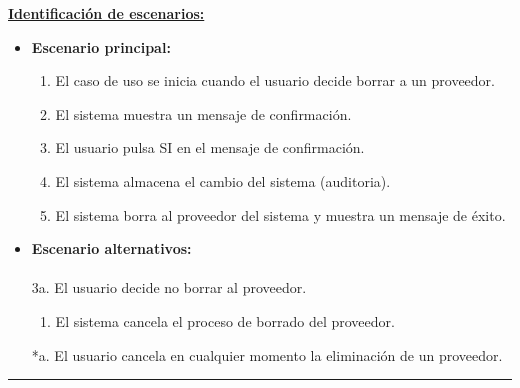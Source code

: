 \underline{\textbf{Identificación de escenarios:}}
\begin{itemize}\renewcommand{\labelitemi}{$\circ$}
 \item \textbf{Escenario principal:}
         \begin{enumerate}
          \item El caso de uso se inicia cuando el usuario decide borrar a un proveedor.
          \item El sistema muestra un mensaje de confirmación.
          \item El usuario pulsa SI en el mensaje de confirmación.
 	  \item El sistema almacena el cambio del sistema (auditoria).
	      \item El sistema borra al proveedor del sistema y muestra un mensaje de éxito.
         \end{enumerate}
  \item \textbf{Escenario alternativos:}\\\\
           3a. El usuario decide no borrar al proveedor.
		\begin{enumerate}
		 \item El sistema cancela el proceso de borrado del proveedor.
		\end{enumerate}
          *a. El usuario cancela en cualquier momento la eliminación de un proveedor.
\end{itemize}
\smallskip
\hrule height 1pt
\smallskip

